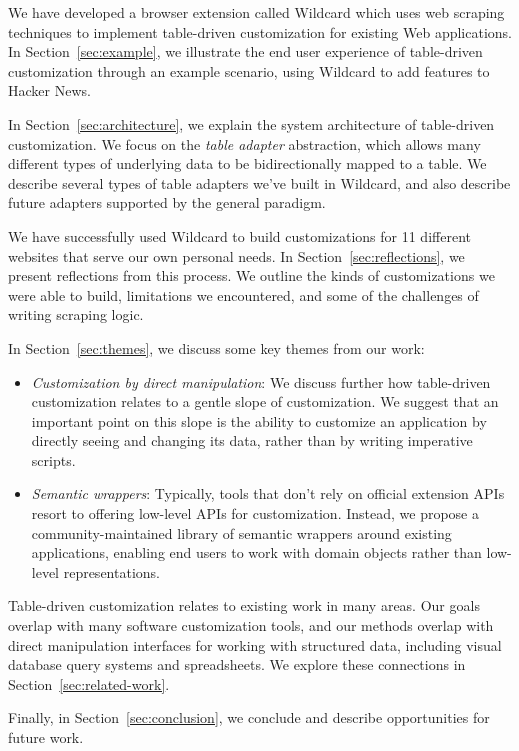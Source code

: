 \documentclass[sigplan,screen,10pt,anonymous,review]{acmart}
\providecommand{\tightlist}{%
  \setlength{\itemsep}{0pt}\setlength{\parskip}{0pt}}
\begin{document}
We have developed a browser extension called Wildcard which uses web
scraping techniques to implement table-driven customization for existing
Web applications. In Section~\ref{sec:example}, we illustrate the end
user experience of table-driven customization through an example
scenario, using Wildcard to add features to Hacker News.

In Section~\ref{sec:architecture}, we explain the system architecture of
table-driven customization. We focus on the \emph{table adapter}
abstraction, which allows many different types of underlying data to be
bidirectionally mapped to a table. We describe several types of table
adapters we've built in Wildcard, and also describe future adapters
supported by the general paradigm.

We have successfully used Wildcard to build customizations for 11
different websites that serve our own personal needs. In
Section~\ref{sec:reflections}, we present reflections from this process.
We outline the kinds of customizations we were able to build,
limitations we encountered, and some of the challenges of writing
scraping logic.

In Section~\ref{sec:themes}, we discuss some key themes from our work:

\begin{itemize}
\tightlist
\item
  \emph{Customization by direct manipulation}: We discuss further how
  table-driven customization relates to a gentle slope of customization.
  We suggest that an important point on this slope is the ability to
  customize an application by directly seeing and changing its data,
  rather than by writing imperative scripts.
\item
  \emph{Semantic wrappers}: Typically, tools that don't rely on official
  extension APIs resort to offering low-level APIs for customization.
  Instead, we propose a community-maintained library of semantic
  wrappers around existing applications, enabling end users to work with
  domain objects rather than low-level representations.
\end{itemize}

Table-driven customization relates to existing work in many areas. Our
goals overlap with many software customization tools, and our methods
overlap with direct manipulation interfaces for working with structured
data, including visual database query systems and spreadsheets. We
explore these connections in Section~\ref{sec:related-work}.

Finally, in Section~\ref{sec:conclusion}, we conclude and describe
opportunities for future work.
\end{document}
